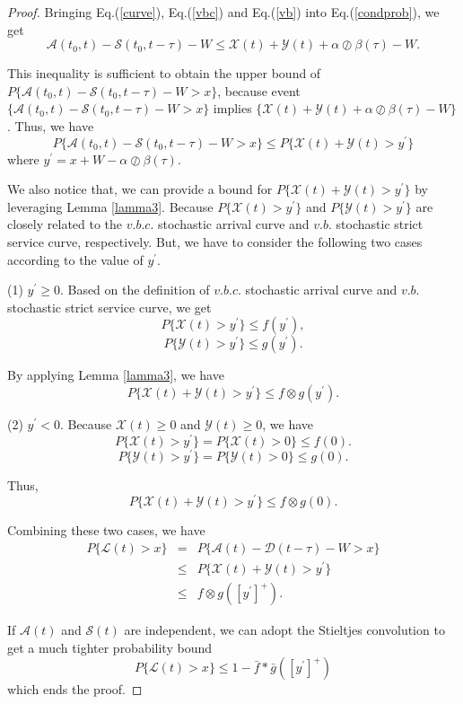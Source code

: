 \documentclass[paper]{ieice}
\newtheorem{proof}{Proof}
\begin{document}
\begin{proof}
Bringing Eq.(\ref{curve}), Eq.(\ref{vbc}) and Eq.(\ref{vb}) into Eq.(\ref{condprob}), we get
$$\mathcal{A}(t_0,t)-\mathcal{S}(t_0,t-\tau)-W \leq \mathcal{X}(t)+\mathcal{Y}(t)+\alpha\oslash\beta(\tau)-W.$$

This inequality is sufficient to obtain the upper bound of $P\{\mathcal{A}(t_0,t)-\mathcal{S}(t_0,t-\tau)-W>x\}$, because event $\{\mathcal{A}(t_0,t)-\mathcal{S}(t_0,t-\tau)-W>x\}$ implies $\{\mathcal{X}(t)+\mathcal{Y}(t)+\alpha\oslash\beta(\tau)-W\}$. Thus, we have
$$P\{\mathcal{A}(t_0,t)-\mathcal{S}(t_0,t-\tau)-W>x\}\leq P\{\mathcal{X}(t)+\mathcal{Y}(t)>y^\prime\}$$
where $y^\prime=x+W-\alpha\oslash\beta(\tau)$.

We also notice that, we can provide a bound for $P\{\mathcal{X}(t)+\mathcal{Y}(t)>y^\prime\}$ by leveraging Lemma \ref{lamma3}. Because $P\{\mathcal{X}(t)>y^\prime\}$ and $P\{\mathcal{Y}(t)>y^\prime\}$ are closely related to the $v.b.c.$ stochastic arrival curve and $v.b.$ stochastic strict service curve, respectively. But, we have to consider the following two cases according to the value of $y^\prime$.

(1) $y^\prime\geq 0$. Based on the definition of $v.b.c.$ stochastic arrival curve and $v.b.$ stochastic strict service curve, we get
$$P\{\mathcal{X}(t)>y^\prime\}\leq f(y^\prime),$$
$$P\{\mathcal{Y}(t)>y^\prime\}\leq g(y^\prime).$$

By applying Lemma \ref{lamma3}, we have
\begin{equation}\label{equation1}
P\{\mathcal{X}(t)+\mathcal{Y}(t)>y^\prime\}\leq f\otimes g(y^\prime).
\end{equation}

(2) $y^\prime<0$. Because $\mathcal{X}(t)\geq 0$ and $\mathcal{Y}(t)\geq 0$, we have
$$P\{\mathcal{X}(t)>y^\prime\}=P\{\mathcal{X}(t)>0\}\leq f(0).$$
$$P\{\mathcal{Y}(t)>y^\prime\}=P\{\mathcal{Y}(t)>0\}\leq g(0).$$

Thus,
\begin{equation}\label{equation2}
P\{\mathcal{X}(t)+\mathcal{Y}(t)>y^\prime\}\leq f\otimes g(0).
\end{equation}

Combining these two cases, we have
\begin{eqnarray*}
  P\{\mathcal{L}(t)>x\}&=&P\{\mathcal{A}(t)-\mathcal{D}(t-\tau)-W>x\}\\
  &\leq&P\{\mathcal{X}(t)+\mathcal{Y}(t)>y^\prime\}\\
  &\leq& f\otimes g([y^\prime]^+).
\end{eqnarray*}

If $\mathcal{A}(t)$ and $\mathcal{S}(t)$ are independent, we can adopt the Stieltjes convolution to get a much tighter probability bound
$$P\{\mathcal{L}(t)>x\}\leq 1-\bar{f}\ast\bar{g}([y^\prime]^+)$$
which ends the proof.\QED
\end{proof}
\end{document}
